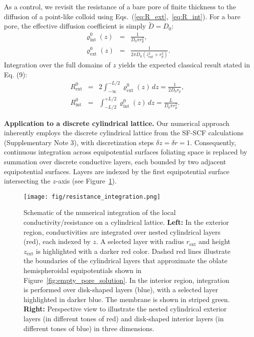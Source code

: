 \documentclass[10pt, a4paper, twocolumn]{article}
\begin{document}
As a control, we revisit the resistance of a bare pore of finite thickness to the diffusion of a point-like colloid using Eqs.~(\ref{eq:R_ext},~\ref{eq:R_int}).
For a bare pore, the effective diffusion coefficient is simply $\tilde{D} = D_0$:
\begin{eqnarray}
    \varrho^{0}_{\text{int}}(z) &=& \frac{1}{D_0 \pi r_{\text{p}}^2},\\[4pt]
    \varrho^{0}_{\text{ext}}(z) &=& \frac{1}{2\pi D_0\left(z_{\text{ext}}^2 + r_{\text{p}}^2\right)}.
\end{eqnarray}
Integration over the full domains of $z$ yields the expected classical result \cite{Brunn1984} stated in Eq. (9):
\begin{eqnarray}
    \label{eq:r_empty}
    R_{\text{ext}}^{0} &=& 2 \int_{-\infty}^{-L/2} \varrho_{\text{ext}}^{0}(z)\,dz = \frac{1}{2 D_0 r_{\text{p}}},\\[4pt]
    R_{\text{int}}^{0} &=& \int_{-L/2}^{+L/2} \varrho_{\text{int}}^{0}(z)\,dz = \frac{L}{D_0 \pi r_{\text{p}}^2}.
\end{eqnarray}

\bigskip\noindent
\textbf{Application to a discrete cylindrical lattice.}
Our numerical approach inherently employs the discrete cylindrical lattice from the SF-SCF calculations (Supplementary Note 3), with discretization steps $\delta z = \delta r = 1$.
Consequently, continuous integration across equipotential surfaces foliating space is replaced by summation over discrete conductive layers, each bounded by two adjacent equipotential surfaces. 
Layers are indexed by the first equipotential surface intersecting the $z$-axis (see Figure~\ref{fig:integration_scheme}).

\begin{figure}[]
    \centering
    \texttt{[image: fig/resistance\_integration.png]}
    \caption{
        Schematic of the numerical integration of the local conductivity/resistance on a cylindrical lattice.    
        \textbf{Left:}
        In the exterior region, conductivities are integrated over nested cylindrical layers (red), each indexed by $z$.
        A selected layer with radius $r_{\text{ext}}$ and height $z_{\text{ext}}$ is highlighted with a darker red color.
        Dashed red lines illustrate the boundaries of the cylindrical layers that approximate the oblate hemispheroidal equipotentials shown in Figure~\ref{fig:empty_pore_solution}.
        In the interior region, integration is performed over disk-shaped layers (blue), with a selected layer highlighted in darker blue.
        The membrane is shown in striped green.
        \textbf{Right:}
        Perspective view to illustrate the nested cylindrical exterior layers (in different tones of red) and disk-shaped interior layers (in different tones of blue) in three dimensions.
    }
    \label{fig:integration_scheme}
\end{figure}
\end{document}
